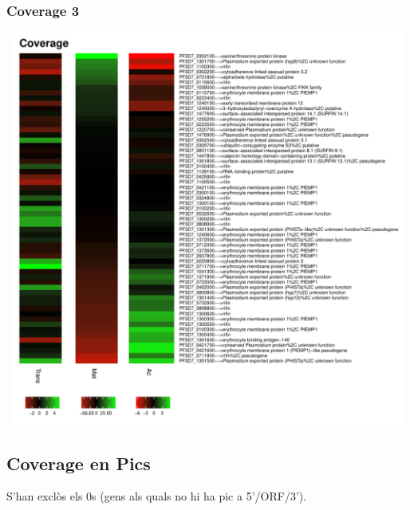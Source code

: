 \documentclass{article}\usepackage[]{graphicx}\usepackage[]{color}
\newenvironment{knitrout}{}{} %
\begin{document}
\subsubsection{Coverage 3}
\begin{knitrout}
\color{fgcolor}

{\centering \includegraphics[width=20cm,height=13cm]{figure/minimal-met_cov_3-1} 

}



\end{knitrout}
\clearpage

\subsection{Coverage en Pics}
S'han exclòs els 0s (gens als quals no hi ha pic a 5'/ORF/3').
\end{document}
